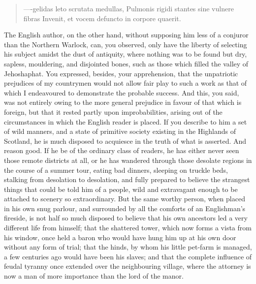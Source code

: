 \begin{quote}
----gelidas leto scrutata medullas,
Pulmonis rigidi stantes sine vulnere fibras
Invenit, et vocem defuncto in corpore quaerit.
\end{quote}

The English author, on the other hand, without supposing him less of a
conjuror than the Northern Warlock, can, you observed, only have the
liberty of selecting his subject amidst the dust of antiquity, where
nothing was to be found but dry, sapless, mouldering, and disjointed
bones, such as those which filled the valley of Jehoshaphat. You
expressed, besides, your apprehension, that the unpatriotic prejudices
of my countrymen would not allow fair play to such a work as that of
which I endeavoured to demonstrate the probable success. And this, you
said, was not entirely owing to the more general prejudice in favour of
that which is foreign, but that it rested partly upon improbabilities,
arising out of the circumstances in which the English reader is placed.
If you describe to him a set of wild manners, and a state of primitive
society existing in the Highlands of Scotland, he is much disposed to
acquiesce in the truth of what is asserted. And reason good. If he be of
the ordinary class of readers, he has either never seen those remote
districts at all, or he has wandered through those desolate regions in
the course of a summer tour, eating bad dinners, sleeping on truckle
beds, stalking from desolation to desolation, and fully prepared to
believe the strangest things that could be told him of a people, wild
and extravagant enough to be attached to scenery so extraordinary. But
the same worthy person, when placed in his own snug parlour, and
surrounded by all the comforts of an Englishman's fireside, is not half
so much disposed to believe that his own ancestors led a very different
life from himself; that the shattered tower, which now forms a vista
from his window, once held a baron who would have hung him up at his own
door without any form of trial; that the hinds, by whom his little
pet-farm is managed, a few centuries ago would have been his slaves; and
that the complete influence of feudal tyranny once extended over the
neighbouring village, where the attorney is now a man of more importance
than the lord of the manor.

